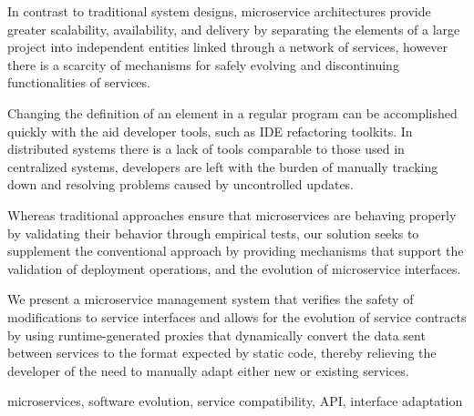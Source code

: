 
%

In contrast to traditional system designs, microservice architectures provide greater
scalability, availability, and delivery by separating the elements of a large project into independent entities linked through a network of services, however there is a scarcity
of mechanisms for safely evolving and discontinuing functionalities of services.

Changing the definition of an element in a regular program can be accomplished quickly with the aid developer tools, such as IDE refactoring toolkits.
In distributed systems there is a lack of tools comparable to those used in centralized systems,
developers are left with the burden of manually tracking down and resolving problems caused by uncontrolled updates.

Whereas traditional approaches ensure that microservices are behaving properly by validating their behavior through empirical tests,
our solution seeks to supplement the conventional approach by providing mechanisms that support the validation of deployment operations, and the evolution of microservice interfaces.

We present a microservice management system that verifies the safety of modifications to service interfaces
and allows for the evolution of service contracts by using runtime-generated proxies that dynamically convert the data sent between services to the format expected by static code,
thereby relieving the developer of the need to manually adapt either new or existing services.

\begin{keywords}
    microservices, software evolution, service compatibility, API, interface adaptation
\end{keywords} 
